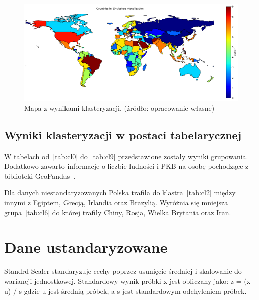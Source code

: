 \documentclass[11pt]{report}
\begin{document}
    \begin{figure}[!htp]
        \centering
        \includegraphics[width=1 \textwidth]{fig/CLUST/10clusterMap.png}
        \caption{Mapa z wynikami klasteryzacji. (źródło: opracowanie własne)}
        \label{fig:clust10}
    \end{figure}

    \subsection{Wyniki klasteryzacji w postaci tabelarycznej}
    W tabelach od~\ref{tab:cl0} do~\ref{tab:cl9} przedstawione zostały wyniki grupowania.
    Dodatkowo zawarto informacje o liczbie ludności i PKB na osobę pochodzące z biblioteki GeoPandas~\cite{geopandas}.

    
    
    
    
    
    
    
    
    
    


    Dla danych niestandaryzowanych Polska trafiła do klastra~\ref{tab:cl2} między innymi z Egiptem, Grecją, Irlandia oraz Brazylią.
    Wyróżnia się mniejsza grupa~\ref{tab:cl6} do której trafiły Chiny, Rosja, Wielka Brytania oraz Iran.


    \section{Dane ustandaryzowane}
    Standrd Scaler standaryzuje cechy poprzez usunięcie średniej i skalowanie do wariancji jednostkowej.
    Standardowy wynik próbki x jest obliczany jako:
    z = (x - u) / s
    gdzie u jest średnią próbek, a s jest standardowym odchyleniem próbek.
\end{document}
